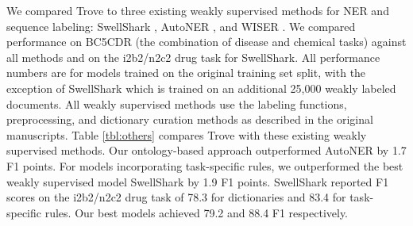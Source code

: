 \documentclass{article}
\begin{document}
We compared Trove to three existing weakly supervised methods for NER and sequence labeling: SwellShark \cite{Fries2017-bh}, AutoNER \cite{Shang2018-sb}, and WISER \cite{Safranchik2020-no}. 
We compared performance on BC5CDR (the combination of disease and chemical tasks) against all methods and on the i2b2/n2c2 drug task for SwellShark. 
All performance numbers are for models trained on the original training set split, with the exception of SwellShark which is trained on an additional 25,000 weakly labeled documents. 
All weakly supervised methods use the labeling functions, preprocessing, and dictionary curation methods as described in the original manuscripts.
Table \ref{tbl:others} compares Trove with these existing weakly supervised methods. 
Our ontology-based approach outperformed AutoNER by 1.7 F1 points. 
For models incorporating task-specific rules, we outperformed the best weakly supervised model SwellShark by 1.9 F1 points. 
SwellShark reported F1 scores on the i2b2/n2c2 drug task of 78.3 for dictionaries and 83.4 for task-specific rules. 
Our best models achieved 79.2 and 88.4 F1 respectively. 
\end{document}
